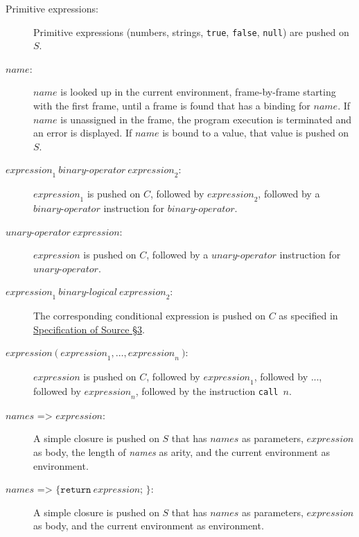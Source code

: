 \begin{description}
\item[Primitive expressions:]
Primitive expressions (numbers, strings, \lstinline{true}, \lstinline{false},
\lstinline{null}) are pushed on $S$.

\item[$\textit{name}$:]
$\textit{name}$ is looked up in the current environment, frame-by-frame starting with
the first frame, until a frame is found that has a binding for 
$\textit{name}$. If
$\textit{name}$ is unassigned in the frame, the program execution is terminated
and an error is displayed. If
$\textit{name}$ is bound to a value, that value is pushed on $S$.

\item[$\textit{expression}_1\ \textit{binary-operator}\ \textit{expression}_2$:]
$\textit{expression}_1$ is pushed on $C$, followed by
$\textit{expression}_2$, followed by a
$\textit{binary-operator}$ instruction for
$\textit{binary-operator}$.

\item[$\textit{unary-operator}\ \textit{expression}$:]
$\textit{expression}$ is pushed on $C$, followed by a
$\textit{unary-operator}$ instruction for
$\textit{unary-operator}$.

\item[$\textit{expression}_1\ \textit{binary-logical}\ \textit{expression}_2$:]
The corresponding conditional expression 
is pushed on $C$ as specified in
\href{https://docs.sourceacademy.org/source_3.pdf}{\color{blue}Specification of Source \S 3}.

\item[$\textit{expression}\ \texttt{(}\ \textit{expression}_1,\ldots,\textit{expression}_n\
\texttt{)}$:]
$\textit{expression}$ is pushed on $C$, followed by
$\textit{expression}_1$, followed by ..., followed by
$\textit{expression}_n$, followed by
the instruction \texttt{call}\ $n$.

\item[$\textit{names} \texttt{ => } \textit{expression}$:]
A simple closure is pushed on $S$ that has
$\textit{names}$ as parameters, 
$\textit{expression}$ as body,
the length of \textit{names} as arity,
and the current environment as environment.

\item[$\textit{names} \texttt{ => \{ return}\ \textit{expression}\texttt{; \}}$:]
A simple closure is pushed on $S$ that has
$\textit{names}$ as parameters, 
$\textit{expression}$ as body, and the current environment as environment.


\end{description}
